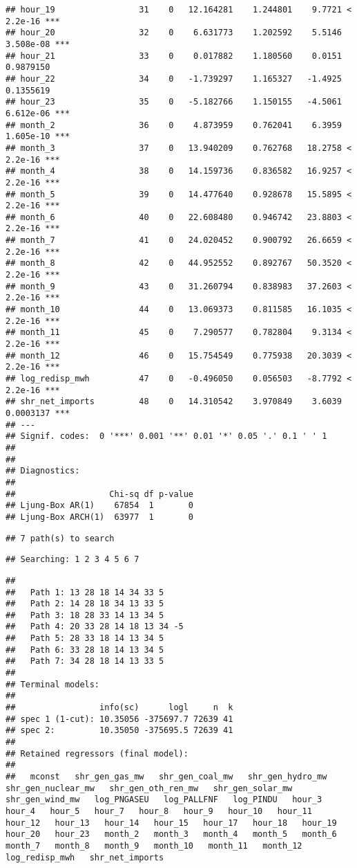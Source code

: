 \documentclass[
]{article}
\begin{document}
\begin{verbatim}
## hour_19                 31    0   12.164281    1.244801    9.7721 < 2.2e-16 ***
## hour_20                 32    0    6.631773    1.202592    5.5146 3.508e-08 ***
## hour_21                 33    0    0.017882    1.180560    0.0151 0.9879150    
## hour_22                 34    0   -1.739297    1.165327   -1.4925 0.1355619    
## hour_23                 35    0   -5.182766    1.150155   -4.5061 6.612e-06 ***
## month_2                 36    0    4.873959    0.762041    6.3959 1.605e-10 ***
## month_3                 37    0   13.940209    0.762768   18.2758 < 2.2e-16 ***
## month_4                 38    0   14.159736    0.836582   16.9257 < 2.2e-16 ***
## month_5                 39    0   14.477640    0.928678   15.5895 < 2.2e-16 ***
## month_6                 40    0   22.608480    0.946742   23.8803 < 2.2e-16 ***
## month_7                 41    0   24.020452    0.900792   26.6659 < 2.2e-16 ***
## month_8                 42    0   44.952552    0.892767   50.3520 < 2.2e-16 ***
## month_9                 43    0   31.260794    0.838983   37.2603 < 2.2e-16 ***
## month_10                44    0   13.069373    0.811585   16.1035 < 2.2e-16 ***
## month_11                45    0    7.290577    0.782804    9.3134 < 2.2e-16 ***
## month_12                46    0   15.754549    0.775938   20.3039 < 2.2e-16 ***
## log_redisp_mwh          47    0   -0.496050    0.056503   -8.7792 < 2.2e-16 ***
## shr_net_imports         48    0   14.310542    3.970849    3.6039 0.0003137 ***
## ---
## Signif. codes:  0 '***' 0.001 '**' 0.01 '*' 0.05 '.' 0.1 ' ' 1
## 
## 
## Diagnostics:
## 
##                   Chi-sq df p-value
## Ljung-Box AR(1)    67854  1       0
## Ljung-Box ARCH(1)  63977  1       0
\end{verbatim}

\begin{verbatim}
## 7 path(s) to search
\end{verbatim}

\begin{verbatim}
## Searching: 1 2 3 4 5 6 7
\end{verbatim}

\begin{verbatim}
## 
##   Path 1: 13 28 18 14 34 33 5 
##   Path 2: 14 28 18 34 13 33 5 
##   Path 3: 18 28 33 14 13 34 5 
##   Path 4: 20 33 28 14 18 13 34 -5 
##   Path 5: 28 33 18 14 13 34 5 
##   Path 6: 33 28 18 14 13 34 5 
##   Path 7: 34 28 18 14 13 33 5 
## 
## Terminal models:
## 
##                 info(sc)      logl     n  k
## spec 1 (1-cut): 10.35056 -375697.7 72639 41
## spec 2:         10.35050 -375695.5 72639 41
## 
## Retained regressors (final model):
## 
##   mconst   shr_gen_gas_mw   shr_gen_coal_mw   shr_gen_hydro_mw   shr_gen_nuclear_mw   shr_gen_oth_ren_mw   shr_gen_solar_mw   shr_gen_wind_mw   log_PNGASEU   log_PALLFNF   log_PINDU   hour_3   hour_4   hour_5   hour_7   hour_8   hour_9   hour_10   hour_11   hour_12   hour_13   hour_14   hour_15   hour_17   hour_18   hour_19   hour_20   hour_23   month_2   month_3   month_4   month_5   month_6   month_7   month_8   month_9   month_10   month_11   month_12   log_redisp_mwh   shr_net_imports
\end{verbatim}
\end{document}
